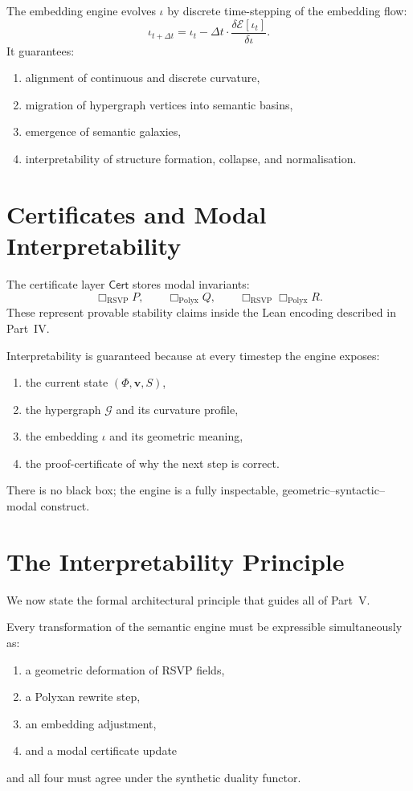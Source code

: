 The embedding engine evolves $\iota$ by discrete time-stepping of
the embedding flow:
\[
   \iota_{t+\Delta t}
     = \iota_t - \Delta t \cdot \frac{\delta\mathcal{E}[\iota_t]}{\delta \iota}.
\]
It guarantees:
\begin{enumerate}
\item alignment of continuous and discrete curvature,
\item migration of hypergraph vertices into semantic basins,
\item emergence of semantic galaxies,
\item interpretability of structure formation, collapse, and normalisation.
\end{enumerate}

\section{Certificates and Modal Interpretability}

The certificate layer \(\mathsf{Cert}\) stores modal invariants:
\[
  \Box_{\mathrm{RSVP}} P,
  \qquad
  \Box_{\mathrm{Polyx}} Q,
  \qquad
  \Box_{\mathrm{RSVP}}\Box_{\mathrm{Polyx}} R.
\]
These represent provable stability claims inside the Lean encoding
described in Part~IV.

Interpretability is guaranteed because at every timestep the engine
exposes:
\begin{enumerate}
\item the current state $(\Phi,\mathbf{v},S)$,
\item the hypergraph $\mathcal{G}$ and its curvature profile,
\item the embedding $\iota$ and its geometric meaning,
\item the proof-certificate of why the next step is correct.
\end{enumerate}

There is no black box; the engine is a fully inspectable,  
geometric--syntactic--modal construct.

\section{The Interpretability Principle}

We now state the formal architectural principle that guides all of
Part~V.

\begin{principle}
Every transformation of the semantic engine must be expressible
simultaneously as:
\begin{enumerate}
\item a geometric deformation of RSVP fields,
\item a Polyxan rewrite step,
\item an embedding adjustment,
\item and a modal certificate update
\end{enumerate}
and all four must agree under the synthetic duality functor.
\end{principle}

